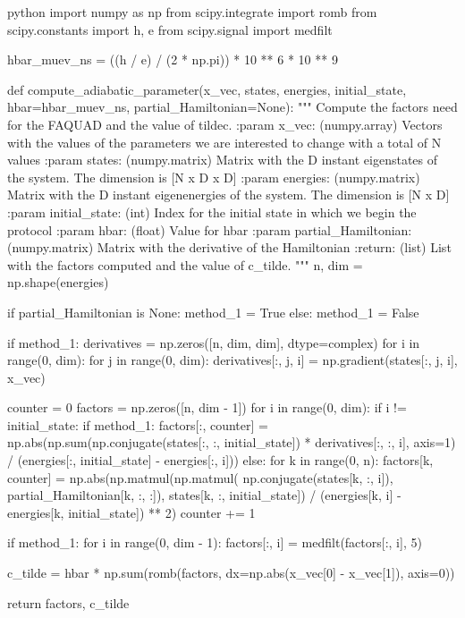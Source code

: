 \begin{mintedbox}{python}
import numpy as np
from scipy.integrate import romb
from scipy.constants import h, e
from scipy.signal import medfilt
	
hbar_muev_ns = ((h / e) / (2 * np.pi)) * 10 ** 6 * 10 ** 9
	
def compute_adiabatic_parameter(x_vec, states, energies, initial_state, hbar=hbar_muev_ns, partial_Hamiltonian=None):
	"""
	Compute the factors need for the FAQUAD and the value of tilde{c}.
	:param x_vec: (numpy.array) Vectors with the values of the parameters we are interested to change with a total of N values
	:param states: (numpy.matrix) Matrix with the D instant eigenstates of the system. The dimension is [N x D x D]
	:param energies: (numpy.matrix) Matrix with the D instant eigenenergies of the system. The dimension is [N x D]
	:param initial_state: (int) Index for the initial state in which we begin the protocol
	:param hbar: (float) Value for hbar
		:param partial_Hamiltonian: (numpy.matrix) Matrix with the derivative of the Hamiltonian
	:return: (list) List with the factors computed and the value of c_tilde.
	"""
	n, dim = np.shape(energies)

	if partial_Hamiltonian is None:
		method_1 = True
	else:
	method_1 = False
	
	if method_1:
		derivatives = np.zeros([n, dim, dim], dtype=complex)
		for i in range(0, dim): 
			for j in range(0, dim):
				derivatives[:, j, i] = np.gradient(states[:, j, i], x_vec)
	
	counter = 0
	factors = np.zeros([n, dim - 1])
	for i in range(0, dim):
		if i != initial_state:
			if method_1:
				factors[:, counter] = np.abs(np.sum(np.conjugate(states[:, :, initial_state]) * derivatives[:, :, i], axis=1) / (energies[:, initial_state] - energies[:, i]))
			else:
				for k in range(0, n):
					factors[k, counter] = np.abs(np.matmul(np.matmul(
					np.conjugate(states[k, :, i]), partial_Hamiltonian[k, :, :]), states[k, :, initial_state]) / (energies[k, i] - energies[k, initial_state]) ** 2)
			counter += 1
	
	if method_1:
		for i in range(0, dim - 1):
			factors[:, i] = medfilt(factors[:, i], 5)
	
	
	c_tilde = hbar * np.sum(romb(factors, dx=np.abs(x_vec[0] - x_vec[1]), axis=0))
	
	return factors, c_tilde
\end{mintedbox}

